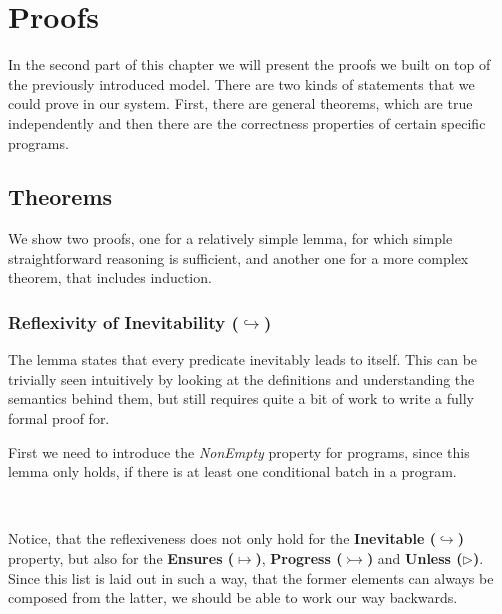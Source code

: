 \section{Proofs}

In the second part of this chapter we will present the proofs we built on top of the previously introduced model. There are two kinds of statements that we could prove in our system. First, there are general theorems, which are true independently and then there are the correctness properties of certain specific programs.

\subsection{Theorems}

We show two proofs, one for a relatively simple lemma, for which simple straightforward reasoning is sufficient, and another one for a more complex theorem, that includes induction.

\subsubsection{Reflexivity of Inevitability ($\hookrightarrow$)}

The lemma states that every predicate inevitably leads to itself. This can be trivially seen intuitively by looking at the definitions and understanding the semantics behind them, but still requires quite a bit of work to write a fully formal proof for. 

First we need to introduce the \textit{NonEmpty} property for programs, since this lemma only holds, if there is at least one conditional batch in a program.

\begin{code}
    \>[2]\AgdaSpace{}%
    \AgdaSymbol{:}\AgdaSpace{}%
    \AgdaSpace{}%
    \AgdaSpace{}%
    \<%
    \\
    \>[2]\AgdaSpace{}%
    \AgdaSpace{}%
    \AgdaSymbol{=}\AgdaSpace{}%
    \AgdaSpace{}%
    \AgdaSymbol{(}\AgdaSpace{}%
    \AgdaSpace{}%
    \AgdaInductiveConstructor{[]}\AgdaSymbol{)}\<%
\end{code}

Notice, that the reflexiveness does not only hold for the \textbf{Inevitable ($\hookrightarrow$)} property, but also for the \textbf{Ensures ($\mapsto$)}, \textbf{Progress ($\rightarrowtail$)} and \textbf{Unless ($\rhd$)}. Since this list is laid out in such a way, that the former elements can always be composed from the latter, we should be able to work our way backwards.

